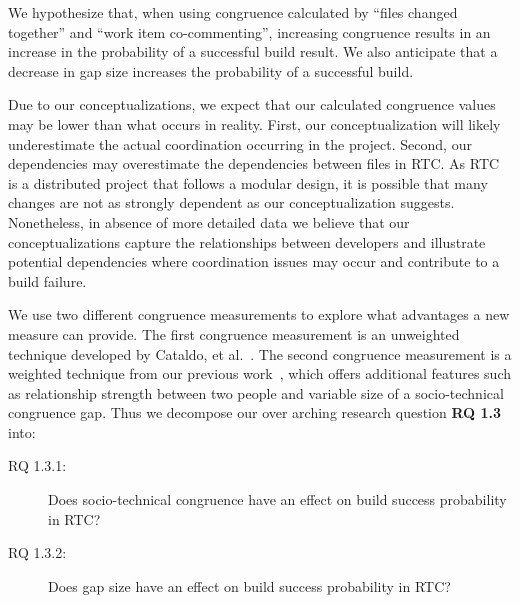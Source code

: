 We hypothesize that, when using congruence calculated by ``files changed together'' and ``work item co-commenting'', increasing congruence results in an increase in the probability of a successful build result. We also anticipate that a decrease in gap size increases the probability of a successful build.

Due to our conceptualizations, we expect that our calculated congruence values may be lower than what occurs in reality. First, our conceptualization will likely underestimate the actual coordination occurring in the project.
Second, our dependencies may overestimate the dependencies between files in RTC.
As RTC is a distributed project that follows a modular design, it is possible that many changes are not as strongly dependent as our conceptualization suggests. Nonetheless, in absence of more detailed data we believe that our conceptualizations capture the relationships between developers and illustrate potential dependencies where coordination issues may occur and contribute to a build failure.

We use two different congruence measurements to explore what advantages a new measure can provide. The first congruence measurement is an unweighted technique developed by Cataldo, et al.~\cite{cataldo:cscw:2006}. The second congruence measurement is a weighted technique from our previous work~\cite{kwan2009:weighted}, which offers additional features such as relationship strength between two people and variable size of a socio-technical congruence gap.
Thus we decompose our over arching research question \textbf{RQ 1.3} into:

\begin{description}
\item[RQ 1.3.1:] Does socio-technical congruence have an effect on build success probability in RTC?
\item[RQ 1.3.2:] Does gap size have an effect on build success probability in RTC?
\end{description}

%
%
%
%

